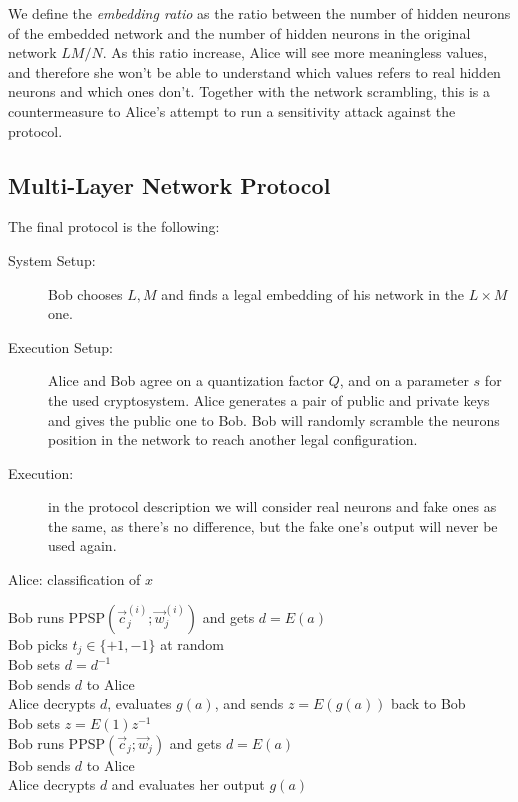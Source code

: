 \documentclass[11pt,oribibl,runningheads]{llncs}
\begin{document}
We define the {\em embedding ratio} as the ratio between the number of hidden neurons of the embedded network and the number of hidden neurons in the original network $LM/N$.
As this ratio increase, Alice will see more meaningless values, and therefore she won't be able to understand which values refers to real hidden neurons and which ones don't. Together with the network scrambling, this is a countermeasure to Alice's attempt to run a sensitivity attack against the protocol.


\subsection{Multi-Layer Network Protocol}
The final protocol is the following:
\begin{description}
    \item[System Setup:] Bob chooses $L, M$ and finds a legal embedding of his network in
    the $L \times M$ one.
    \item[Execution Setup:] Alice and Bob agree on a quantization
    factor $Q$, and on a parameter $s$ for the used cryptosystem.
    Alice generates a pair of public and private keys and gives the
    public one to Bob. Bob will randomly scramble the neurons position
    in the network to reach another legal configuration.
    \item[Execution:] in the protocol description we will
    consider real neurons and fake ones as the same, as there's no
    difference, but the fake one's output will never be used again.
\end{description}
\begin{algorithm}
\label{alg:PPNNSigm}
  {Alice: classification of $x$}
\begin{algtab}
        Bob runs \textsc{PPSP}$(\vec{c}^{(i)}_j;\vec{w}^{(i)}_j)$ and gets $d=E(a)$\\
        Bob picks $t_j \in \{+1,-1\}$ at random \\
            Bob sets $d=d^{-1}$ \\
        \algend
        Bob sends $d$ to Alice \\
        Alice decrypts $d$, evaluates $g(a)$, and sends $z=E(g(a))$
        back to Bob \\
            Bob sets $z=E(1)z^{-1}$ \\
        \algend
    \algend
\algend
{}
        Bob runs \textsc{PPSP}$(\vec{c}_j;\vec{w}_j)$ and gets $d=E(a)$\\
        Bob sends $d$ to Alice \\
        Alice decrypts $d$ and evaluates her output $g(a)$\\
\algend
\end{algtab}
\end{algorithm}
\end{document}
